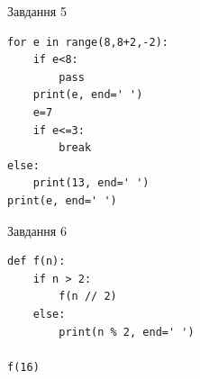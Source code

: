 \documentclass[12pt, ukrainian]{article}
\begin{document}
{\vspace{15mm}
\begin{minipage}[t]{9.7cm}                
{\begin{center}Завдання {5}\end{center}}
\begin{verbatim}
for e in range(8,8+2,-2):
    if e<8:
        pass
    print(e, end=' ')
    e=7
    if e<=3:
        break
else:
    print(13, end=' ')
print(e, end=' ')
\end{verbatim}     
\end{minipage}
\vline \hspace{8mm}
\begin{minipage}[t]{8.0cm}                
{\begin{center}Завдання {6}\end{center}}
\begin{verbatim}
def f(n):
    if n > 2:
        f(n // 2)
    else:
        print(n % 2, end=' ')

f(16)
\end{verbatim}     
\end{minipage}

}
\newpage
\end{document}
